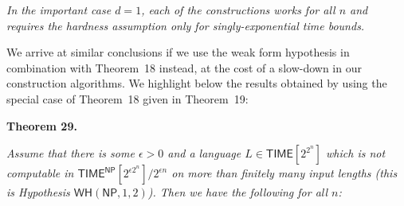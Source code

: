\documentclass[10pt,a4paper]{article}
\begin{document}
\emph{In the important case $d=1$, each of the constructions works for all $n$ and requires the hardness assumption only for singly-exponential time bounds.}\par






We arrive at similar conclusions if we use the weak form hypothesis in combination with Theorem 18 instead, at the cost of a slow-down in our construction algorithms. We highlight below the results obtained by using the special case of Theorem 18 given in Theorem 19:\par





\par\medskip\noindent\textbf{
\textbf{Theorem 29}\textbf{.}
}\par



\emph{Assume that there is some $\epsilon>0$ and a language $L\in{\mathsf{TIME}}[2^{2^{n}}]$ which is not computable in ${\mathsf{TIME}}^{\mathsf{NP}}[2^{\epsilon 2^{n}}]/2^{\epsilon n}$ on more than finitely many input lengths (this is Hypothesis $\mathsf{WH}({\mathsf{NP}},1,2)$). Then we have the following for all $n$:}\par
\end{document}
